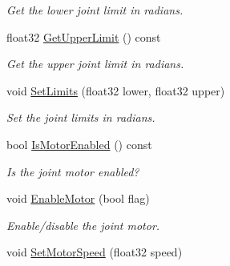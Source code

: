 \begin{DoxyCompactItemize}
\begin{DoxyCompactList}\small\item\em Get the lower joint limit in radians. \end{DoxyCompactList}\item 
float32 \hyperlink{classb2_revolute_joint_a9bb683118879611e84e4cb26bdc8d39f}{Get\+Upper\+Limit} () const \hypertarget{classb2_revolute_joint_a9bb683118879611e84e4cb26bdc8d39f}{}\label{classb2_revolute_joint_a9bb683118879611e84e4cb26bdc8d39f}

\begin{DoxyCompactList}\small\item\em Get the upper joint limit in radians. \end{DoxyCompactList}\item 
void \hyperlink{classb2_revolute_joint_a32f9393d8a6b993fd523f0f643c28107}{Set\+Limits} (float32 lower, float32 upper)\hypertarget{classb2_revolute_joint_a32f9393d8a6b993fd523f0f643c28107}{}\label{classb2_revolute_joint_a32f9393d8a6b993fd523f0f643c28107}

\begin{DoxyCompactList}\small\item\em Set the joint limits in radians. \end{DoxyCompactList}\item 
bool \hyperlink{classb2_revolute_joint_a9477b305db080e17dce8f2c6da0babb0}{Is\+Motor\+Enabled} () const \hypertarget{classb2_revolute_joint_a9477b305db080e17dce8f2c6da0babb0}{}\label{classb2_revolute_joint_a9477b305db080e17dce8f2c6da0babb0}

\begin{DoxyCompactList}\small\item\em Is the joint motor enabled? \end{DoxyCompactList}\item 
void \hyperlink{classb2_revolute_joint_a80ed5a07d9a0e07d010808a73ffae6ff}{Enable\+Motor} (bool flag)\hypertarget{classb2_revolute_joint_a80ed5a07d9a0e07d010808a73ffae6ff}{}\label{classb2_revolute_joint_a80ed5a07d9a0e07d010808a73ffae6ff}

\begin{DoxyCompactList}\small\item\em Enable/disable the joint motor. \end{DoxyCompactList}\item 
void \hyperlink{classb2_revolute_joint_a56f60bb1ea69048c8a455da49d62bf65}{Set\+Motor\+Speed} (float32 speed)\hypertarget{classb2_revolute_joint_a56f60bb1ea69048c8a455da49d62bf65}{}\label{classb2_revolute_joint_a56f60bb1ea69048c8a455da49d62bf65}


\end{DoxyCompactItemize}
